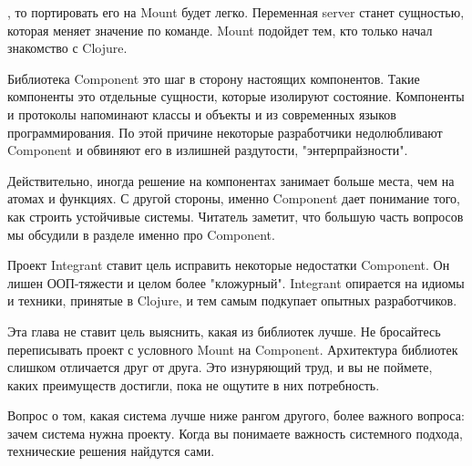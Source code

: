 , то портировать его на Mount будет легко. Переменная server станет сущностью,
которая меняет значение по команде. Mount подойдет тем, кто только начал
знакомство с Clojure.

Библиотека Component это шаг в сторону настоящих компонентов. Такие компоненты
это отдельные сущности, которые изолируют состояние. Компоненты и протоколы
напоминают классы и объекты и из современных языков программирования. По этой
причине некоторые разработчики недолюбливают Component и обвиняют его в излишней
раздутости, "энтерпрайзности".

Действительно, иногда решение на компонентах занимает больше места, чем на
атомах и функциях. С другой стороны, именно Component дает понимание того, как
строить устойчивые системы. Читатель заметит, что большую часть вопросов мы
обсудили в разделе именно про Component.

Проект Integrant ставит цель исправить некоторые недостатки Component. Он лишен
ООП-тяжести и целом более "кложурный". Integrant опирается на идиомы и техники,
принятые в Clojure, и тем самым подкупает опытных разработчиков.

Эта глава не ставит цель выяснить, какая из библиотек лучше. Не бросайтесь
переписывать проект с условного Mount на Component. Архитектура библиотек
слишком отличается друг от друга. Это изнуряющий труд, и вы не поймете, каких
преимуществ достигли, пока не ощутите в них потребность.

Вопрос о том, какая система лучше ниже рангом другого, более важного вопроса:
зачем система нужна проекту. Когда вы понимаете важность системного подхода,
технические решения найдутся сами.
